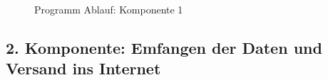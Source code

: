\begin{center}
	\begin{figure}[h]
	 
	 \noindent{}
	 \caption[PAP komponente 1]{Programm Ablauf: Komponente 1}
	 \label{fig:zeitplanung}
	\end{figure}
\end{center}

\subsection{2. Komponente: Emfangen der Daten und Versand ins Internet} \label{Empfänger}

